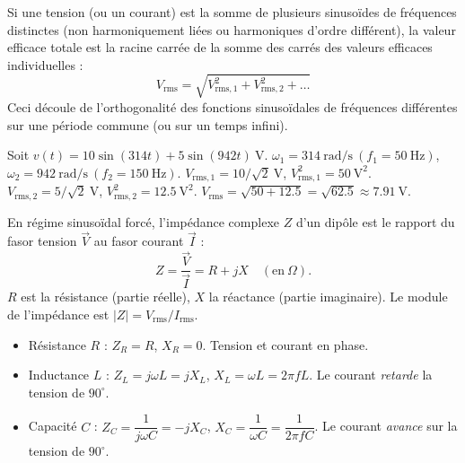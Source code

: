 \documentclass[11pt]{article}
\newcommand{\cle}[1]{{\popxbold\color{popdark}#1}}
\newcounter{popsec}
\newcounter{popsub}
\newcommand{\courssub}[1]{%
  \stepcounter{popsub}%
  \par\vspace{9pt}\noindent{\popxbold\fontsize{11.5}{13}\selectfont\color{popink}{\color{poporange}\thepopsec.\thepopsub}\hspace{6pt}#1}\par\nopagebreak\vspace{4pt}
}
\begin{document}
\begin{propriete}
Si une tension (ou un courant) est la somme de plusieurs sinusoïdes de fréquences distinctes (non harmoniquement liées ou harmoniques d'ordre différent), la valeur efficace totale est la racine carrée de la somme des carrés des valeurs efficaces individuelles :
\[
V_{\mathrm{rms}} = \sqrt{V_{\mathrm{rms},1}^2 + V_{\mathrm{rms},2}^2 + \dots}
\]
Ceci découle de l'orthogonalité des fonctions sinusoïdales de fréquences différentes sur une période commune (ou sur un temps infini).
\end{propriete}

\begin{exemplebox}
Soit $v(t) = 10\sin(314t) + 5\sin(942t)\ \mathrm{V}$.
$\omega_1 = 314\ \mathrm{rad/s}\ (f_1=50\ \mathrm{Hz})$, $\omega_2 = 942\ \mathrm{rad/s}\ (f_2=150\ \mathrm{Hz})$.
$V_{\mathrm{rms},1} = 10/\sqrt{2}\ \mathrm{V}$, $V_{\mathrm{rms},1}^2 = 50\ \mathrm{V^2}$.
$V_{\mathrm{rms},2} = 5/\sqrt{2}\ \mathrm{V}$, $V_{\mathrm{rms},2}^2 = 12.5\ \mathrm{V^2}$.
$V_{\mathrm{rms}} = \sqrt{50 + 12.5} = \sqrt{62.5} \approx 7.91\ \mathrm{V}$.
\end{exemplebox}

\courssub{Impédance et réactance}

\begin{definition}
En régime sinusoïdal forcé, l'\cle{impédance complexe} $Z$ d'un dipôle est le rapport du fasor tension $\vec{V}$ au fasor courant $\vec{I}$ :
\[
Z = \frac{\vec{V}}{\vec{I}} = R + jX \quad (\mathrm{en}\ \Omega).
\]
$R$ est la \cle{résistance} (partie réelle), $X$ la \cle{réactance} (partie imaginaire). Le module de l'impédance est $|Z| = V_{\mathrm{rms}}/I_{\mathrm{rms}}$.
\end{definition}

\begin{propriete}
\begin{itemize}
\item Résistance $R$ : $Z_R = R$, $X_R = 0$. Tension et courant en phase.
\item Inductance $L$ : $Z_L = j\omega L = jX_L$, $X_L = \omega L = 2\pi f L$. Le courant \emph{retarde} la tension de $90^\circ$.
\item Capacité $C$ : $Z_C = \dfrac{1}{j\omega C} = -jX_C$, $X_C = \dfrac{1}{\omega C} = \dfrac{1}{2\pi f C}$. Le courant \emph{avance} sur la tension de $90^\circ$.
\end{itemize}
\end{propriete}
\end{document}
